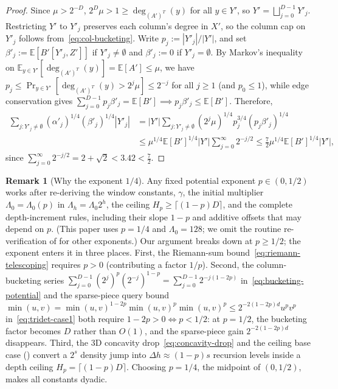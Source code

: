 \documentclass[11pt]{article}
\theoremstyle{definition}
\newtheorem{remark}[theorem]{Remark}
\renewcommand{\label}[1]{}%
\newcommand{\E}{\mathbb{E}}
\newcommand{\abs}[1]{\left\lvert #1 \right\rvert}
\newcommand{\dens}[1]{\E[#1]}
\begin{document}
\begin{proof}
Since $\mu > 2^{-D}$, $2^D\mu > 1 \ge \deg_{(A')^T}(y)$ for all $y \in Y'$, so $Y' = \bigsqcup_{j=0}^{D-1} Y'_j$. Restricting $Y'$ to $Y'_j$ preserves each column's degree in $X'$, so the column cap on $Y'_j$ follows from~\eqref{eq:col-bucketing}. Write $p_j := \abs{Y'_j}/\abs{Y'}$, and set $\beta'_j := \dens{B'[Y'_j, Z']}$ if $Y'_j \ne \emptyset$ and $\beta'_j := 0$ if $Y'_j = \emptyset$. By Markov's inequality on $\E_{y \in Y'}[\deg_{(A')^T}(y)] = \dens{A'} \le \mu$, we have $p_j \le \Pr_{y \in Y'}[\deg_{(A')^T}(y) > 2^j\mu] \le 2^{-j}$ for all $j \ge 1$ (and $p_0 \le 1$), while edge conservation gives $\sum_{j=0}^{D-1} p_j \beta'_j = \dens{B'} \implies p_j\beta'_j \le \dens{B'}$. Therefore,
\begin{align*}
    \sum_{j : Y'_j \ne \emptyset} (\alpha'_j)^{1/4}(\beta'_j)^{1/4}\abs{Y'_j} &= \abs{Y'}\sum_{j : Y'_j \ne \emptyset} (2^j\mu)^{1/4} p_j^{3/4}(p_j\beta'_j)^{1/4} \\
    &\le \mu^{1/4}\dens{B'}^{1/4}\abs{Y'}\sum_{j=0}^\infty 2^{-j/2} \le \frac{7}{2}\mu^{1/4}\dens{B'}^{1/4}\abs{Y'},
\end{align*}
since $\sum_{j=0}^\infty 2^{-j/2} = 2 + \sqrt{2} < 3.42 < \frac{7}{2}$.
\end{proof}

\begin{remark}[Why the exponent $1/4$]
\label{rem:why-one-fourth}
Any fixed potential exponent $p \in (0, 1/2)$ works after re-deriving the window constants, $\gamma$, the initial multiplier $\Lambda_0 = \Lambda_0(p)$ in $\Lambda_h = \Lambda_0 2^h$, the ceiling $H_p \ge \lceil (1 - p)D \rceil$, and the complete depth-increment rules, including their slope $1 - p$ and additive offsets that may depend on $p$. (This paper uses $p = 1/4$ and $\Lambda_0 = 128$; we omit the routine re-verification of  for other exponents.) Our argument breaks down at $p \ge 1/2$; the exponent enters it in three places. First, the Riemann-sum bound~\eqref{eq:riemann-telescoping} requires $p > 0$ (contributing a factor $1/p$). Second, the column-bucketing series $\sum_{j=0}^{D-1} (2^j)^p (2^{-j})^{1-p} = \sum_{j=0}^{D-1} 2^{-j(1-2p)}$ in~\eqref{eq:bucketing-potential} and the sparse-piece query bound $\min(u, v) = \min(u, v)^{1-2p}\min(u,v)^p\min(u,v)^p \le 2^{-2(1-2p)d} u^p v^p$ in~\eqref{eq:tridet-case1} both require $1 - 2p > 0 \iff p < 1/2$: at $p = 1/2$, the bucketing factor becomes $D$ rather than $O(1)$, and the sparse-piece gain $2^{-2(1-2p)d}$ disappears. Third, the 3D concavity drop~\eqref{eq:concavity-drop} and the ceiling base case () convert a $2^s$ density jump into $\Delta h \approx (1 - p)s$ recursion levels inside a depth ceiling $H_p = \lceil (1 - p)D \rceil$. Choosing $p = 1/4$, the midpoint of $(0, 1/2)$, makes all constants dyadic.
\end{remark}
\end{document}
